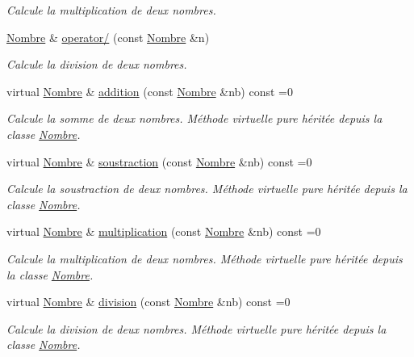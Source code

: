 \begin{DoxyCompactItemize}
\begin{DoxyCompactList}\small\item\em \-Calcule la multiplication de deux nombres. \end{DoxyCompactList}\item 
\hyperlink{classNombre}{\-Nombre} \& \hyperlink{classNombre_a0d46caf2a005dceb4f643a5d167d79a9}{operator/} (const \hyperlink{classNombre}{\-Nombre} \&n)
\begin{DoxyCompactList}\small\item\em \-Calcule la division de deux nombres. \end{DoxyCompactList}\item 
virtual \hyperlink{classNombre}{\-Nombre} \& \hyperlink{classNombre_ad40df43089fcb34d072b4e955a0eb4fe}{addition} (const \hyperlink{classNombre}{\-Nombre} \&nb) const =0
\begin{DoxyCompactList}\small\item\em \-Calcule la somme de deux nombres. \-Méthode virtuelle pure héritée depuis la classe \hyperlink{classNombre}{\-Nombre}. \end{DoxyCompactList}\item 
virtual \hyperlink{classNombre}{\-Nombre} \& \hyperlink{classNombre_aae525a90cd3ddeda1ce8349a23634e75}{soustraction} (const \hyperlink{classNombre}{\-Nombre} \&nb) const =0
\begin{DoxyCompactList}\small\item\em \-Calcule la soustraction de deux nombres. \-Méthode virtuelle pure héritée depuis la classe \hyperlink{classNombre}{\-Nombre}. \end{DoxyCompactList}\item 
virtual \hyperlink{classNombre}{\-Nombre} \& \hyperlink{classNombre_a742022c5e875fe24046d1c28cf043b42}{multiplication} (const \hyperlink{classNombre}{\-Nombre} \&nb) const =0
\begin{DoxyCompactList}\small\item\em \-Calcule la multiplication de deux nombres. \-Méthode virtuelle pure héritée depuis la classe \hyperlink{classNombre}{\-Nombre}. \end{DoxyCompactList}\item 
virtual \hyperlink{classNombre}{\-Nombre} \& \hyperlink{classNombre_ae4e773caee4bb349cdbe7155e26290d6}{division} (const \hyperlink{classNombre}{\-Nombre} \&nb) const =0
\begin{DoxyCompactList}\small\item\em \-Calcule la division de deux nombres. \-Méthode virtuelle pure héritée depuis la classe \hyperlink{classNombre}{\-Nombre}. \end{DoxyCompactList}\item 

\end{DoxyCompactItemize}
